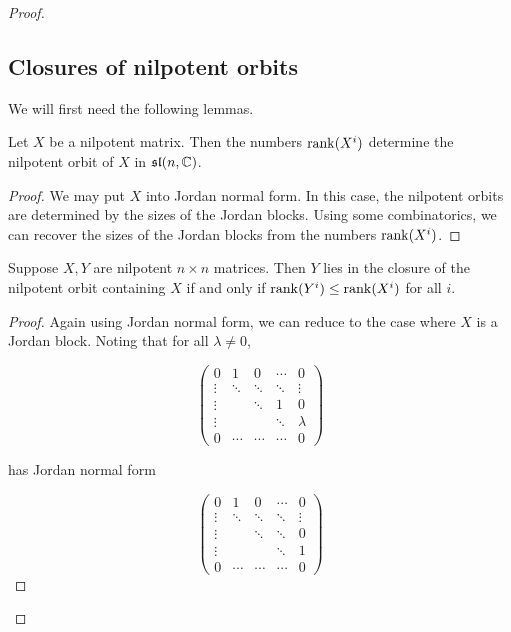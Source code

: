 \documentclass{article}
\renewcommand{\sl}{\mathfrak{sl}}
\begin{document}
\begin{proof}
    \subsection{Closures of nilpotent orbits}

    We will first need the following lemmas.

    \begin{lemma}
        Let \(X\) be a nilpotent matrix. Then the numbers \(\rank(X^i)\) determine the nilpotent orbit of \(X\) in \(\sl(n, \C)\).
    \end{lemma}

    \begin{proof}
        We may put \(X\) into Jordan normal form. In this case, the nilpotent orbits are determined by the sizes of the Jordan blocks. Using some combinatorics, we can recover the sizes of the Jordan blocks from the numbers \(\rank(X^i)\).
    \end{proof}

    \begin{lemma}
        Suppose \(X, Y\) are nilpotent \(n \times n\) matrices. Then \(Y\) lies in the closure of the nilpotent orbit containing \(X\) if and only if \(\rank(Y^i) \le \rank(X^i)\) for all \(i\).
    \end{lemma}

    \begin{proof}
        Again using Jordan normal form, we can reduce to the case where \(X\) is a Jordan block. Noting that for all \(\lambda \ne 0\),

        \[\begin{pmatrix}
            0 & 1 & 0 & \cdots  & 0 \\
            \vdots & \ddots & \ddots & \ddots & \vdots\\
            \vdots &  & \ddots & 1 & 0 \\
            \vdots &  &  & \ddots & \lambda \\
            0 & \cdots & \cdots & \cdots & 0
        \end{pmatrix}\]

        has Jordan normal form

        \[\begin{pmatrix}
            0 & 1 & 0 & \cdots  & 0 \\
            \vdots & \ddots & \ddots & \ddots & \vdots\\
            \vdots &  & \ddots & \ddots & 0 \\
            \vdots &  &  & \ddots & 1 \\
            0 & \cdots & \cdots & \cdots & 0
        \end{pmatrix}\]


\end{proof}
\end{proof}
\end{document}
